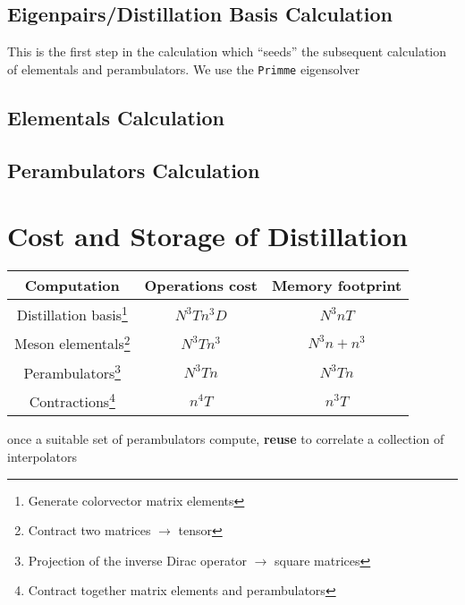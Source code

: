 \subsection{Eigenpairs/Distillation Basis Calculation}
This is the first step in the calculation which ``seeds'' the subsequent calculation of elementals and perambulators. We use the \verb|Primme| eigensolver   

\subsection{Elementals Calculation}

\subsection{Perambulators Calculation}

\section{Cost and Storage of Distillation}
      \vspace{1em}
       
         \begin{minipage}{16cm}
        \hspace*{2em}\begin{tabular}{ccc}
        Computation    & Operations cost & Memory footprint \\ \hline
        Distillation basis\footnote{Generate colorvector matrix elements}& $N^3Tn^3D$         & $N^3nT$      \\
        Meson elementals\footnote{Contract two matrices $\to$ tensor} & $N^3Tn^3$      & $N^3n + n^3$  \\
        Perambulators\footnote{Projection of the inverse Dirac operator $\to$ square matrices} & $N^3Tn$   & $N^3Tn$            \\
        Contractions\footnote{Contract together matrix elements and perambulators}   & $n^4T$    & $n^{3}T$   
        \end{tabular}
        \end{minipage}
        once a suitable set of perambulators compute, \textbf{reuse} to correlate a collection of interpolators
        
